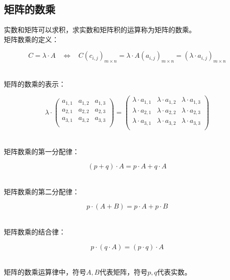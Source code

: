 \documentclass[UTF8]{ctexart}
\begin{document}
\subsection{矩阵的数乘}
    实数和矩阵可以求积，求实数和矩阵积的运算称为矩阵的数乘。\\[3mm]
    矩阵数乘的定义：
    \begin{large}
        \begin{equation*}
            C=\lambda\cdot A~~~~\Longleftrightarrow~~~~C(c_{i,j})_{m\times n}=\lambda\cdot A(a_{i,j})_{m\times n}=(\lambda\cdot a_{i,j})_{m\times n}
        \end{equation*}
    \end{large}\\
    矩阵的数乘的表示：\vspace{5pt}
    \begin{large}
        \begin{equation*}     
            \lambda\cdot
            \begin{pmatrix}
                a_{1,1}&a_{1,2}&a_{1,3}\\
                a_{2,1}&a_{2,2}&a_{2,3}\\
                a_{3,1}&a_{3,2}&a_{3,3}\\
            \end{pmatrix}
            =
            \begin{pmatrix}
                \lambda\cdot a_{1,1}&\lambda\cdot a_{1,2}&\lambda\cdot a_{1,3}\\
                \lambda\cdot a_{2,1}&\lambda\cdot a_{2,2}&\lambda\cdot a_{2,3}\\
                \lambda\cdot a_{3,1}&\lambda\cdot a_{3,2}&\lambda\cdot a_{3,3}\\
            \end{pmatrix}
        \end{equation*}
    \end{large}\\[5mm]
    矩阵数乘的第一分配律：
    \begin{large}
        \begin{equation*}
            (p+q)\cdot A=p\cdot A+q\cdot A
        \end{equation*}
    \end{large}\\
    矩阵数乘的第二分配律：
    \begin{large}
        \begin{equation*}
            p\cdot(A+B)=p\cdot A+p\cdot B
        \end{equation*}
    \end{large}\\
    矩阵数乘的结合律：
    \begin{large}
        \begin{equation*}
            p\cdot(q\cdot A)=(p\cdot q)\cdot A
        \end{equation*}
    \end{large}\\
    矩阵的数乘运算律中，符号$A,B$代表矩阵，符号$p,q$代表实数。\vspace{3pt}
\end{document}
